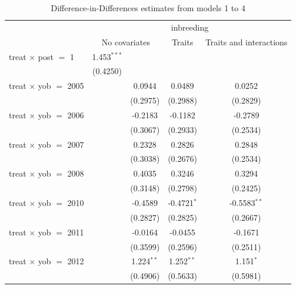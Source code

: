 
\begin{table}[htbp]
   \caption{\label{tab:table1} Difference-in-Differences estimates from models 1 to 4}
   \bigskip
   \centering
   \begin{tabular}{lcccc}
      \toprule
       & \multicolumn{4}{c}{inbreeding}\\
       & \multicolumn{2}{c}{No covariates} & Traits & Traits and interactions \\ 
      \midrule 
      treat $\times$ post $=$ 1      & 1.453$^{***}$ &               &               &   \\   
                                     & (0.4250)      &               &               &   \\   
      treat $\times$ yob $=$ 2005    &               & 0.0944        & 0.0489        & 0.0252\\   
                                     &               & (0.2975)      & (0.2988)      & (0.2829)\\   
      treat $\times$ yob $=$ 2006    &               & -0.2183       & -0.1182       & -0.2789\\   
                                     &               & (0.3067)      & (0.2933)      & (0.2534)\\   
      treat $\times$ yob $=$ 2007    &               & 0.2328        & 0.2826        & 0.2848\\   
                                     &               & (0.3038)      & (0.2676)      & (0.2534)\\   
      treat $\times$ yob $=$ 2008    &               & 0.4035        & 0.3246        & 0.3294\\   
                                     &               & (0.3148)      & (0.2798)      & (0.2425)\\   
      treat $\times$ yob $=$ 2010    &               & -0.4589       & -0.4721$^{*}$ & -0.5583$^{**}$\\   
                                     &               & (0.2827)      & (0.2825)      & (0.2667)\\   
      treat $\times$ yob $=$ 2011    &               & -0.0164       & -0.0455       & -0.1671\\   
                                     &               & (0.3599)      & (0.2596)      & (0.2511)\\   
      treat $\times$ yob $=$ 2012    &               & 1.224$^{**}$  & 1.252$^{**}$  & 1.151$^{*}$\\   
                                     &               & (0.4906)      & (0.5633)      & (0.5981)\\   

\end{tabular}
\end{table}

